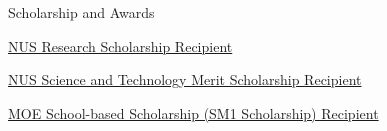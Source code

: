 \begin{rubric}{Scholarship and Awards}


\entry*[2025-2029]
\href{https://nusgs.nus.edu.sg/scholarships/nus-research-scholarship/}{NUS Research Scholarship Recipient}

\entry*[2021-2025]
\href{https://www.nus.edu.sg/oam/scholarships/freshmen-sprs/science-technology-(s-t)-undergraduate-scholarship}{NUS Science and Technology Merit Scholarship Recipient}

\entry*[2016-2020]
\href{https://zh.wikipedia.org/zh-cn/%E4%B8%AD%E6%96%B0%E5%A5%96%E5%AD%A6%E9%87%91%E9%A1%B9%E7%9B%AE}{MOE School-based Scholarship (SM1 Scholarship) Recipient}

\end{rubric}

